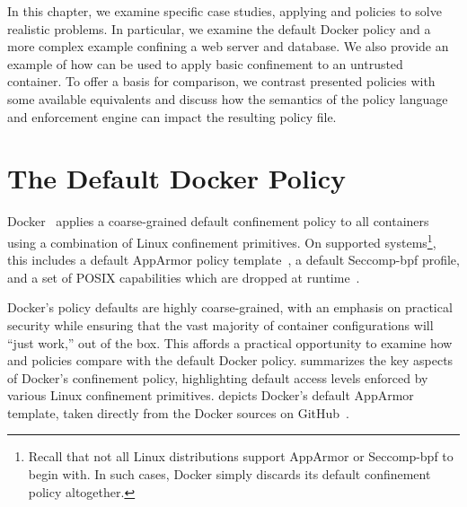 In this chapter, we examine specific case studies, applying \bpfbox{} and \bpfcontain{}
policies to solve realistic problems. In particular, we examine the default Docker policy
and a more complex example confining a web server and database. We also provide an example
of how \bpfcontain{} can be used to apply basic confinement to an untrusted container. To
offer a basis for comparison, we contrast presented policies with some available
equivalents and discuss how the semantics of the policy language and enforcement engine
can impact the resulting policy file.




\section{The Default Docker Policy}

Docker~\cite{docker_security} applies a coarse-grained default confinement policy to all
containers using a combination of Linux confinement primitives. On supported
systems\footnote{Recall that not all Linux distributions support AppArmor or Seccomp-bpf
to begin with. In such cases, Docker simply discards its default confinement policy
altogether.}, this includes a default AppArmor policy template~\cite{docker_apparmor,
docker_default_apparmor}, a default Seccomp-bpf profile, and a set of POSIX capabilities
which are dropped at runtime~\cite{docker_security}.

Docker's policy defaults are highly coarse-grained, with an emphasis on practical security
while ensuring that the vast majority of container configurations will \enquote{just
work,} out of the box. This affords a practical opportunity to examine how \bpfbox{} and
\bpfcontain{} policies compare with the default Docker policy. 
summarizes the key aspects of Docker's confinement policy, highlighting default access
levels enforced by various Linux confinement primitives.  depicts
Docker's default AppArmor template, taken directly from the Docker sources on
GitHub~\cite{docker_default_apparmor}.

